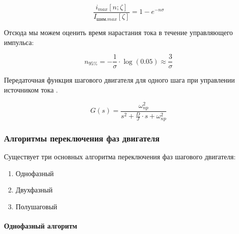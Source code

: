 \begin{equation}
    \label{current_grow_estimate}
    \frac{ i_{max}[n; \zeta] }{ I_{\textit{шим}.max}[\zeta] } = 1 - e^{-n \sigma}
\end{equation}

Отсюда мы можем оценить время нарастания тока в течение управляющего импульса:

$$
    n_{ 95 \% } = - \frac{ 1 }{ \sigma }  \cdot \log{(0.05)} \approx \frac{ 3 }{ \sigma }
$$

Передаточная функция шагового двигателя для одного шага при управлении источником
тока \cite[гл. 4.2, ф-ла 4.65]{Kenio}.

\begin{equation}
    \label{step_motor_transfer_function}
    G(s) = \frac{ \omega_{np}^{2} }
                { s^{2} + \frac{D}{J} \cdot s + \omega_{np}^{2} }
\end{equation}

\newpage
\subsubsection{Алгоритмы переключения фаз двигателя}
\label{sec_step_control_algos}

Существует три основных алгоритма переключения фаз шагового двигателя:

\begin{enumerate}
    \item Однофазный
    \item Двухфазный
    \item Полушаговый
\end{enumerate}

\paragraph{Однофазный алгоритм}

